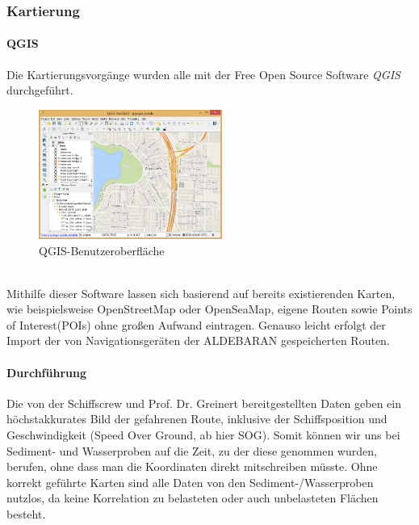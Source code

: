 \subsubsection{Kartierung}
\paragraph{QGIS}
Die Kartierungsvorgänge wurden alle mit der Free Open Source Software \emph{QGIS}\cite{qgis} durchgeführt.
\begin{figure}[ht]
    \centering
    \includegraphics[width=6cm]{Images/QGIS/about-screenshot.png}
    \caption[fig:qgisabout]{QGIS-Benutzeroberfläche}
\end{figure}
\\Mithilfe dieser Software lassen sich basierend auf bereits existierenden Karten, 
wie beispielsweise OpenStreetMap\cite{ostrm} oder OpenSeaMap\cite{oseam}, eigene Routen sowie
Points of Interest(POIs) ohne großen Aufwand eintragen. Genauso leicht erfolgt der Import der von 
Navigationsgeräten der ALDEBARAN gespeicherten Routen. 
\paragraph{Durchführung}
Die von der Schiffscrew und Prof. Dr. Greinert bereitgestellten Daten geben ein höchstakkurates Bild der
gefahrenen Route, inklusive der Schiffsposition und Geschwindigkeit (Speed Over Ground, ab hier SOG).
Somit können wir uns bei Sediment- und Wasserproben auf die Zeit, zu der diese genommen wurden, berufen,
ohne dass man die Koordinaten direkt mitschreiben müsste.
Ohne korrekt geführte Karten sind alle Daten von den Sediment-/Wasserproben nutzlos, da keine Korrelation
zu belasteten oder auch unbelasteten Flächen besteht. 
